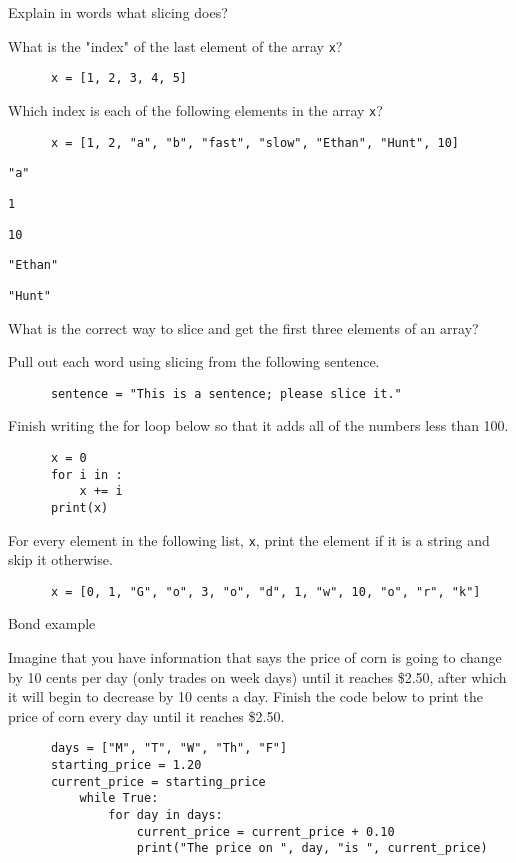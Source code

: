 \documentclass[11pt]{exam}
\begin{document}
\begin{questions}
  \item Explain in words what slicing does?

  \item What is the "index" of the last element of the array \texttt{x}?
    \begin{verbatim}
      x = [1, 2, 3, 4, 5]
    \end{verbatim}

  \item Which index is each of the following elements in the array \texttt{x}?
    \begin{verbatim}
      x = [1, 2, "a", "b", "fast", "slow", "Ethan", "Hunt", 10]
    \end{verbatim}
    \begin{parts}
      \item \texttt{"a"}
      \item \texttt{1}
      \item \texttt{10}
      \item \texttt{"Ethan"}
      \item \texttt{"Hunt"}
    \end{parts}

  \item What is the correct way to slice and get the first three elements of an array?

  \item Pull out each word using slicing from the following sentence.
    \begin{verbatim}
      sentence = "This is a sentence; please slice it."
    \end{verbatim}

  \item Finish writing the for loop below so that it adds all of the numbers less than 100.
    \begin{verbatim}
      x = 0
      for i in :
          x += i
      print(x)
    \end{verbatim}

  \item For every element in the following list, \texttt{x}, print the element if it is a string and skip it otherwise.
    \begin{verbatim}
      x = [0, 1, "G", "o", 3, "o", "d", 1, "w", 10, "o", "r", "k"]
    \end{verbatim}

  \item Bond example

  \item Imagine that you have information that says the price of corn is going to change by 10 cents per day (only trades on week days) until it reaches \$2.50, after which it will begin to decrease by 10 cents a day. Finish the code below to print the price of corn every day until it reaches \$2.50.
    \begin{verbatim}
      days = ["M", "T", "W", "Th", "F"]
      starting_price = 1.20
      current_price = starting_price
          while True:
              for day in days:
                  current_price = current_price + 0.10
                  print("The price on ", day, "is ", current_price)


\end{verbatim}
\end{questions}
\end{document}
